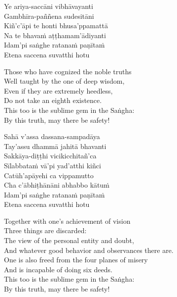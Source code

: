 \begin{pali-hang-continued}
  Ye ariya-saccāni vibhāvayanti\\
  Gambhīra-paññena sudesitāni\\
  Kiñ'c'āpi te honti bhusa'ppamattā\\
  Na te bhavaṁ aṭṭhamam'ādiyanti\\
  Idam'pi saṅghe ratanaṁ paṇītaṁ\\
  Etena saccena suvatthi hotu
\end{pali-hang-continued}

\begin{english-verses}
  Those who have cognized the noble truths\\
  Well taught by the one of deep wisdom,\\
  Even if they are extremely heedless,\\
  Do not take an eighth existence.\\
  This too is the sublime gem in the Saṅgha:\\
  By this truth, may there be safety!
\end{english-verses}

\ifbfive\clearpage\fi
\ifninebythirteen\clearpage\fi

\begin{pali-hang-continued}
  Sahā v'assa dassana-sampadāya\\
  Tay'assu dhammā jahitā bhavanti\\
  Sakkāya-diṭṭhi vicikicchitañ'ca\\
  Sīlabbataṁ vā'pi yad'atthi kiñci\\
  Catūh'apāyehi ca vippamutto\\
  Cha c'ābhiṭhānāni abhabbo kātuṁ\\
  Idam'pi saṅghe ratanaṁ paṇītaṁ\\
  Etena saccena suvatthi hotu
\end{pali-hang-continued}

\begin{english-verses}
  Together with one's achievement of vision\\
  Three things are discarded:\\
  The view of the personal entity and doubt,\\
  And whatever good behavior and observances there are.\\
  One is also freed from the four planes of misery\\
  And is incapable of doing six deeds.\\
  This too is the sublime gem in the Saṅgha:\\
  By this truth, may there be safety!
\end{english-verses}

